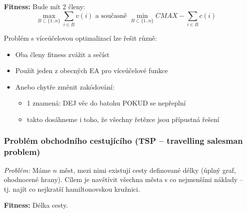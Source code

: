 \textbf{Fitness:} Bude mít 2 členy: 
$$\max\limits_{B \subset \{1..n\}} \sum\limits_{i \in B} v(i) \text{\ \ a současně\ \ } \min\limits_{B \subset \{1..n\}} CMAX - \sum\limits_{i \in B} c(i)$$

Problém s víceúčelovou optimalizací lze řešit různě:
\begin{itemize}
	
	
	\item Oba členy fitness zvážit a sečíst
	\item Použít jeden z obecných EA pro víceúčelové funkce
	\item Anebo chytře změnit zakódování:
	\begin{itemize}	
		
		
		\item 1 znamená: DEJ věc do batohu POKUD se nepřeplní
		\item takto dosáhneme i toho, že všechny řetězce jsou přípustná řešení
	\end{itemize}
\end{itemize}

\subsubsection{Problém obchodního cestujícího (TSP -- travelling salesman problem)}
\textit{Problém:} Máme $n$ měst, mezi nimi existují cesty definované délky (úplný graf, ohodnocené hrany). Cílem je navštívit všechna města s co nejmenšími náklady -- tj. najít co nejkratší hamiltonovskou kružnici.

\textbf{Fitness:} Délka cesty.

